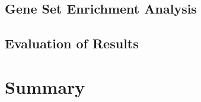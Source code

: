 




\subsection{Gene Set Enrichment Analysis}


\subsection{Evaluation of Results}








\section{Summary}
\enlargethispage{\baselineskip} %

